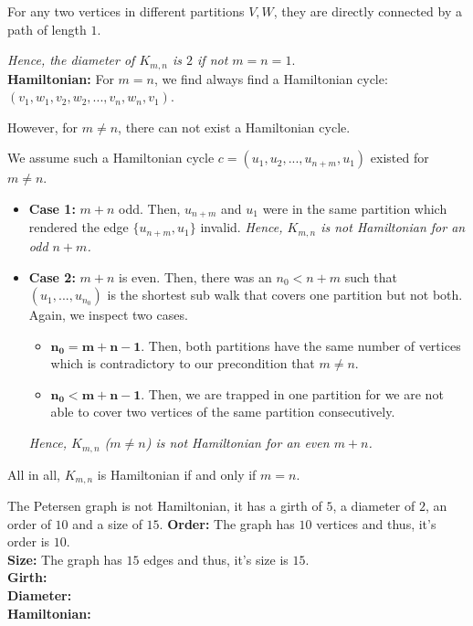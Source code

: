 \documentclass[a4paper]{article}
\begin{document}
\begin{solution}{9}
\begin{theorem}
				For any two vertices in different partitions $V, W$, they are directly connected by a path of length $1$.

				 \emph{Hence, the diameter of $K_{m,n}$ is $2$ if not $m = n = 1$}.\\

			\textbf{Hamiltonian:} For $m = n$, we find always find a Hamiltonian cycle: $(v_1, w_1, v_2, w_2, ..., v_n, w_n, v_1)$.

				However, for $m \neq n$, there can not exist a Hamiltonian cycle.

				We assume such a Hamiltonian cycle $c = (u_1, u_2, ..., u_{n+m}, u_1)$ existed for $m \neq n$. 
				\begin{itemize}
					\item \textbf{Case 1:} $m + n$ odd. Then, $u_{n+m}$ and $u_1$ were in the same partition which rendered the edge $\{u_{n+m}, u_1\}$ invalid. \emph{Hence, $K_{m,n}$ is not Hamiltonian for an odd $n + m$.}
					\item \textbf{Case 2:} $m + n$ is even. Then, there was an $n_0 < n+m$ such that $(u_1, ..., u_{n_0})$ is the shortest sub walk that covers one partition but not both. Again, we inspect two cases.
						\begin{itemize}
							\item $\mathbf{n_0 = m + n - 1}$. Then, both partitions have the same number of vertices which is contradictory to our precondition that $m \neq n$.
							\item $\mathbf{n_0 < m + n - 1}$. Then, we are trapped in one partition for we are not able to cover two vertices of the same partition consecutively.
						\end{itemize}
					\emph{Hence, $K_{m, n}$ ($m \neq n$) is not Hamiltonian for an even $m + n$.}
				\end{itemize}

				All in all, $K_{m,n}$ is Hamiltonian if and only if $m = n$.
		\end{theorem}
			
		\newpage

		\begin{theorem}{The Petersen graph is not Hamiltonian, it has a girth of $5$, a diameter of $2$, an order of $10$ and a size of $15$.}
			\textbf{Order:} The graph has $10$ vertices and thus, it's order is $10$.\\
			
			\textbf{Size:} The graph has $15$ edges and thus, it's size is $15$.\\

			\textbf{Girth:} \\

			\textbf{Diameter:} \\

			\textbf{Hamiltonian:}

		\end{theorem}
	\end{solution}
\end{document}
